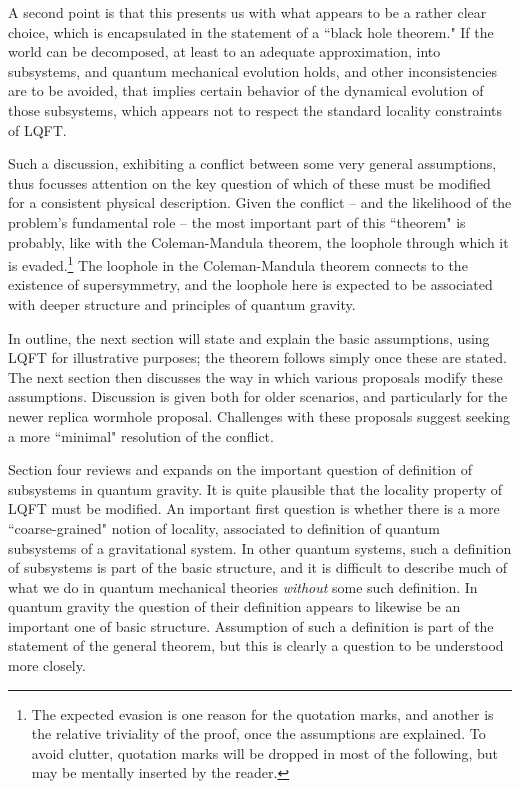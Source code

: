 \documentclass[12pt]{article}
\numberwithin{equation}{section}
\begin{document}
A second point is that this presents us with what appears to be a rather clear choice, which is encapsulated in the statement of a ``black hole theorem."  If the world can be decomposed, at least to an adequate approximation, into subsystems, and quantum mechanical evolution holds, and other inconsistencies are to be avoided, that implies certain behavior of the dynamical evolution of those subsystems, which appears not to respect the standard locality constraints of LQFT.

Such a discussion, exhibiting a conflict between some very general assumptions, thus focusses attention on the key question of which of these must be modified for a consistent physical description.  Given the conflict -- and the likelihood of the problem's fundamental role -- the most important part of this ``theorem" is probably, like with the Coleman-Mandula theorem\cite{CoMa}, the loophole through which it is evaded.\footnote{The expected evasion   is one reason for the quotation marks, and another is the relative triviality of the proof, once the assumptions are explained.  To avoid clutter,  quotation marks will be dropped in most of the following, but may be mentally inserted by the reader.}  The loophole in the Coleman-Mandula theorem connects to the existence of supersymmetry, and the loophole here is expected to be associated with  deeper structure and principles of quantum gravity.  

In outline, the next section will state and explain the basic assumptions, using LQFT for illustrative purposes; the theorem follows simply once these are stated.  The next section then discusses the way in which various proposals modify these assumptions. Discussion is given both for older scenarios, and particularly for the newer replica wormhole proposal.  Challenges with these proposals suggest seeking a more ``minimal" resolution of the conflict.

Section four reviews and expands on the important question of definition of subsystems in quantum gravity.  It is quite plausible that the locality property of LQFT must be modified.   An important first question is whether there is a more ``coarse-grained" notion of locality, associated to definition of quantum subsystems of a gravitational system.  In other quantum systems, such a definition of subsystems is part of the basic structure, and it is difficult to describe much of what we do in quantum mechanical theories {\it without} some such definition.  In quantum gravity the question of their definition appears to likewise be an important one of basic structure.  Assumption of such a definition is part of the statement of the general theorem, but this is clearly a question to be understood more closely. 
\end{document}
